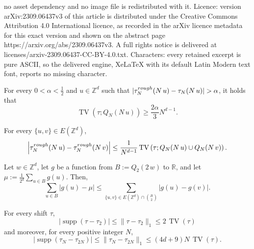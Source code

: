 \documentclass[10pt,a4paper]{amsart}
\DeclareMathOperator{\TV}{TV}
\DeclareMathOperator{\supp}{supp}
\newcommand{\R}{\mathbb{R}}
\newcommand{\Z}{\mathbb{Z}}
\begin{document}
no asset dependency and no image file is redistributed with it. Licence: version arXiv:2309.06437v3 of this article is distributed under the Creative Commons Attribution 4.0 International licence, as recorded in the arXiv licence metadata for this exact version and shown on the abstract page https://arxiv.org/abs/2309.06437v3. A full rights notice is delivered at licenses/arxiv-2309.06437-CC-BY-4.0.txt. Characters: every retained excerpt is pure ASCII, so the delivered engine, XeLaTeX with its default Latin Modern text font, reports no missing character.
\begin{lemma}\label{lem:Ron}
For every $0<\alpha<\frac{1}{2}$ and $u\in\Z^d$ such that $\lvert\tau^{\rm rough}_N(N\,u)-\tau_N(N\,u)\rvert>\alpha$, it holds that 
\begin{equation*}
\TV\left(\tau; Q_N(N\,u)\right)\geq \frac{2\alpha}{3} N^{d-1}.
\end{equation*}
\end{lemma}

\begin{lemma}
\label{lem:rough}
For every $\{u,v\}\in E(\Z^d)$, 
\begin{equation*}
\left\lvert\tau^{\rm rough}_N(N\,u)-\tau^{\rm rough}_N(N\,v)\right\rvert
\leq\frac{1}{N^{d-1}}\TV\left(\tau; Q_N(N\,u)\cup Q_N(N\,v)\right).
\end{equation*}
\end{lemma}

\begin{lemma}
\label{lem:diff_rough}
Let $w\in{\mathbb Z}^d$, let $g$ be a function from $B:=Q_2(2\,w)$ to $\R$, and let $\mu:=\frac{1}{2^d}\sum_{u\in B}g(u)$. Then,
$$
\sum_{u\in B} \lvert g(u)-\mu \rvert
\leq\sum_{\{u,v\}\in E(\Z^d)\cap\binom{B}{2}} \lvert g(u)-g(v) \rvert.
$$
\end{lemma}

\begin{proposition}\label{prop:functional_diff}
For every shift $\tau$,
$$
\lvert\supp(\tau-\tau_2)\rvert\leq\lVert \tau-\tau_2\rVert_1
\leq 2\, \TV(\tau) 
$$
and moreover, for every positive integer $N$,
$$
\lvert\supp(\tau_N-\tau_{2N})\rvert\leq\lVert \tau_N-\tau_{2N}\rVert_1
\leq (4d+9)N\, \TV(\tau). 
$$
\end{proposition}
\end{document}
